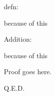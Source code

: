 \documentclass[10pt]{article}
\begin{document}
\blueline

\begin{center}
    \begin{definition}
        defn:
    \end{definition}
    \begin{proofb}
        because of this
    \end{proofb}
\end{center}

\blueline

\begin{center}
    \begin{property}
        Addition:
    \end{property}
    \begin{proofb}
        because of this
    \end{proofb}
\end{center}

\vspace{0.3cm}
\begin{proofb}
Proof goes here.
\end{proofb}

\vspace{0.3cm}
\begin{center}
    Q.E.D.
\end{center}

\blueline
\end{document}
